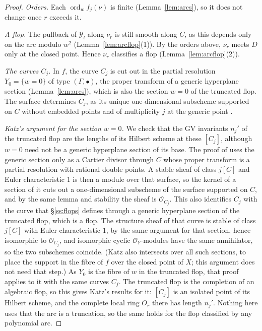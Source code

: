 \documentclass[11pt]{amsart}
\numberwithin{table}{section}
\numberwithin{figure}{section}
\numberwithin{equation}{section}
\theoremstyle{definition}
\theoremstyle{plain}
\newcommand{\cO}{\mathcal{O}}
\newcommand{\cY}{\mathcal{Y}}
\newcommand{\bul}{\bullet}
\DeclareMathOperator{\ord}{ord}
\begin{document}
\begin{proof}
\emph{Orders.} Each $\ord_w f_j(\nu)$ is finite (Lemma~\ref{lem:arcs}), so it does not change once $r$ exceeds it.

\emph{A flop.} The pullback of $\cY_l$ along $\nu_r$ is still smooth along $C$, as this depends only on the arc modulo $w^2$ (Lemma~\ref{lem:arcflop}(1)). By the orders above, $\nu_r$ meets $D$ only at the closed point. Hence $\nu_r$ classifies a flop (Lemma~\ref{lem:arcflop}(2)).

\emph{The curves $C_j$.} In $f$, the curve $C_j$ is cut out in the partial resolution $Y_0 = \{w = 0\}$ of type $(\Gamma, \bul)$, the proper transform of a generic hyperplane section (Lemma~\ref{lem:arcs}), which is also the section $w = 0$ of the truncated flop. The surface determines $C_j$, as its unique one-dimensional subscheme supported on $C$ without embedded points and of multiplicity $j$ at the generic point \cite[Lemma~3.2(i)]{K08}.

\emph{Katz's argument for the section $w = 0$.} We check that the GV invariants $n_j'$ of the truncated flop are the lengths of its Hilbert scheme at these $[C_j]$, although $w = 0$ need not be a generic hyperplane section of its base. The proof of \cite[Prop~3.3]{K08} uses the generic section only as a Cartier divisor through $C$ whose proper transform is a partial resolution with rational double points. A stable sheaf of class $j[C]$ and Euler characteristic $1$ is then a module over that surface, so the kernel of a section of it cuts out a one-dimensional subscheme of the surface supported on $C$, and by the same lemma and stability the sheaf is $\cO_{C_j}$. This also identifies $C_j$ with the curve that \S\ref{ss:flops} defines through a generic hyperplane section of the truncated flop, which is a flop. The structure sheaf of that curve is stable of class $j[C]$ with Euler characteristic $1$, by the same argument for that section, hence isomorphic to $\cO_{C_j}$, and isomorphic cyclic $\cO_Y$-modules have the same annihilator, so the two subschemes coincide. (Katz also intersects over all such sections, to place the support in the fibre of $f$ over the closed point of $X$; this argument does not need that step.) As $Y_0$ is the fibre of $w$ in the truncated flop, that proof applies to it with the same curves $C_j$. The truncated flop is the completion of an algebraic flop, so this gives Katz's results for it: $[C_j]$ is an isolated point of its Hilbert scheme, and the complete local ring $O_r$ there has length $n_j'$. Nothing here uses that the arc is a truncation, so the same holds for the flop classified by any polynomial arc.


\end{proof}
\end{document}
